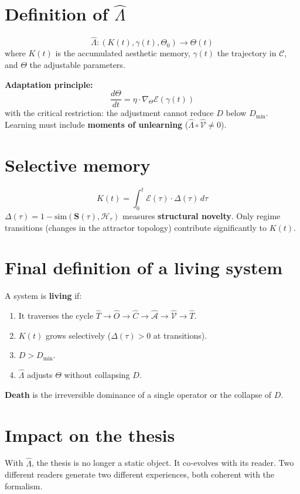 \documentclass[12pt,oneside]{report}
\begin{document}
\section{Definition of \(\hat{\Lambda}\)}
\[
\hat{\Lambda} : (K(t), \gamma(t), \Theta_0) \longrightarrow \Theta(t)
\]
where \(K(t)\) is the accumulated aesthetic memory, \(\gamma(t)\) the trajectory in \(\mathcal{C}\), and \(\Theta\) the adjustable parameters.

\textbf{Adaptation principle:}
\[
\frac{d\Theta}{dt} = \eta \cdot \nabla_{\Theta} \mathcal{E}(\gamma(t))
\]
with the critical restriction: the adjustment cannot reduce \(D\) below \(D_{\min}\). Learning must include \textbf{moments of unlearning} (\(\hat{\Lambda} \circ \hat{\mathcal{V}} \neq 0\)).

\section{Selective memory}
\[
K(t) = \int_0^t \mathcal{E}(\tau) \cdot \Delta(\tau) \, d\tau
\]
\(\Delta(\tau) = 1 - \text{sim}(\mathbf{S}(\tau), \mathcal{H}_\tau)\) measures \textbf{structural novelty}. Only regime transitions (changes in the attractor topology) contribute significantly to \(K(t)\).

\section{Final definition of a living system}
A system is \textbf{living} if:
\begin{enumerate}
\item It traverses the cycle \(\hat{T} \to \hat{O} \to \hat{C} \to \hat{\mathcal{A}} \to \hat{\mathcal{V}} \to \hat{T}\).
\item \(K(t)\) grows selectively (\(\Delta(\tau) > 0\) at transitions).
\item \(D > D_{\min}\).
\item \(\hat{\Lambda}\) adjusts \(\Theta\) without collapsing \(D\).
\end{enumerate}
\textbf{Death} is the irreversible dominance of a single operator or the collapse of \(D\).

\section{Impact on the thesis}
With \(\hat{\Lambda}\), the thesis is no longer a static object. It co‑evolves with its reader. Two different readers generate two different experiences, both coherent with the formalism.
\end{document}
